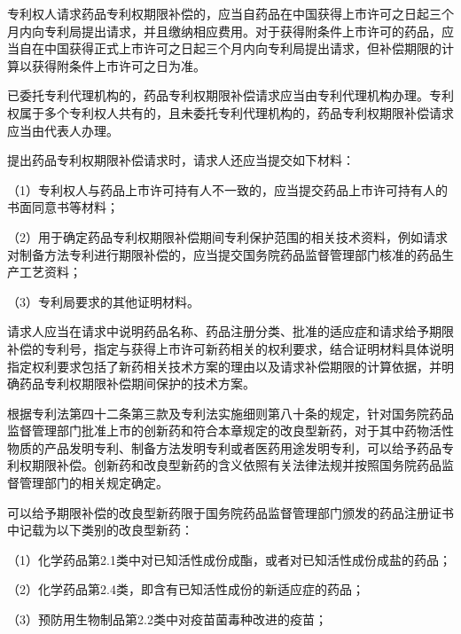 专利权人请求药品专利权期限补偿的，应当自药品在中国获得上市许可之日起三个月内向专利局提出请求，并且缴纳相应费用。对于获得附条件上市许可的药品，应当自在中国获得正式上市许可之日起三个月内向专利局提出请求，但补偿期限的计算以获得附条件上市许可之日为准。

已委托专利代理机构的，药品专利权期限补偿请求应当由专利代理机构办理。专利权属于多个专利权人共有的，且未委托专利代理机构的，药品专利权期限补偿请求应当由代表人办理。

提出药品专利权期限补偿请求时，请求人还应当提交如下材料：

{\setlength{\parindent}{17.1bp}（1）专利权人与药品上市许可持有人不一致的，应当提交药品上市许可持有人的书面同意书等材料；\par}

{\setlength{\parindent}{17.1bp}（2）用于确定药品专利权期限补偿期间专利保护范围的相关技术资料，例如请求对制备方法专利进行期限补偿的，应当提交国务院药品监督管理部门核准的药品生产工艺资料；\par}

{\setlength{\parindent}{17.1bp}（3）专利局要求的其他证明材料。\par}

请求人应当在请求中说明药品名称、药品注册分类、批准的适应症和请求给予期限补偿的专利号，指定与获得上市许可新药相关的权利要求，结合证明材料具体说明指定权利要求包括了新药相关技术方案的理由以及请求补偿期限的计算依据，并明确药品专利权期限补偿期间保护的技术方案。

根据专利法第四十二条第三款及专利法实施细则第八十条的规定，针对国务院药品监督管理部门批准上市的创新药和符合本章规定的改良型新药，对于其中药物活性物质的产品发明专利、制备方法发明专利或者医药用途发明专利，可以给予药品专利权期限补偿。创新药和改良型新药的含义依照有关法律法规并按照国务院药品监督管理部门的相关规定确定。

可以给予期限补偿的改良型新药限于国务院药品监督管理部门颁发的药品注册证书中记载为以下类别的改良型新药：

{\setlength{\parindent}{17.1bp}（1）化学药品第2.1类中对已知活性成份成酯，或者对已知活性成份成盐的药品；\par}

{\setlength{\parindent}{17.1bp}（2）化学药品第2.4类，即含有已知活性成份的新适应症的药品；\par}

{\setlength{\parindent}{17.1bp}（3）预防用生物制品第2.2类中对疫苗菌毒种改进的疫苗；\par}

